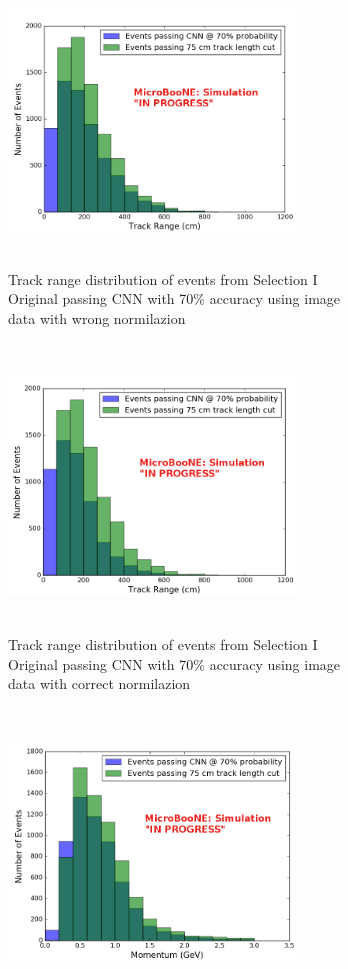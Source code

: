 \begin{figure}[htp!]
\centering
	\begin{subfigure}[b]{.45\textwidth}
	\includegraphics[width=3in,height=3in]{figs/sel1_trackrange_wrongnorm_acc70_0706.png}
	\caption{Track range distribution of events from Selection I Original passing CNN with 70\% accuracy using image data with wrong normilazion}
	\label{fig:track_wrongnorm}
	\end{subfigure}
	\quad
	\begin{subfigure}[b]{.45\textwidth}
	\includegraphics[width=3in,height=3in]{figs/sel1_trackrange_rightnorm_acc70_0706.png}
	\caption{Track range distribution of events from Selection I Original passing CNN with 70\% accuracy using image data with correct normilazion}
	\label{fig:track_rightnorm}
	\end{subfigure}
	\quad
	\begin{subfigure}[b]{.45\textwidth}
	\includegraphics[width=3in,height=3in]{figs/sel1_parP_wrongnorm_acc70_0706.png}

\end{subfigure}
\end{figure}
